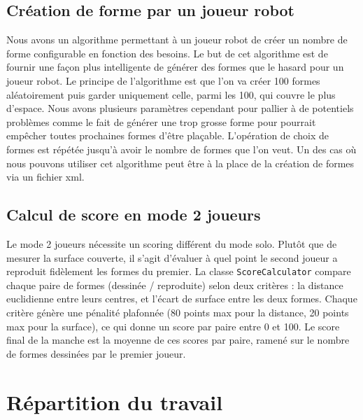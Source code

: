 \documentclass{article}
\begin{document}
\subsection{Création de forme par un joueur robot}
Nous avons un algorithme permettant à un joueur robot de créer un nombre de forme configurable en fonction des besoins. Le but de cet algorithme est de fournir une façon plus intelligente de générer des formes que le hasard pour un joueur robot.
Le principe de l'algorithme est que l'on va créer 100 formes aléatoirement puis garder uniquement celle, parmi les 100, qui couvre le plus d'espace. Nous avons plusieurs paramètres cependant pour pallier à de potentiels problèmes comme le fait de générer une trop grosse forme pour pourrait empêcher toutes prochaines formes d'être plaçable. L'opération de choix de formes est répétée jusqu'à avoir le nombre de formes que l'on veut. Un des cas où nous pouvons utiliser cet algorithme peut être à la place de la création de formes via un fichier xml.

\subsection{Calcul de score en mode 2 joueurs}
Le mode 2 joueurs nécessite un scoring différent du mode solo. Plutôt que de mesurer la surface couverte, il s'agit d'évaluer à quel point le second joueur a reproduit fidèlement les formes du premier. La classe \texttt{ScoreCalculator} compare chaque paire de formes (dessinée / reproduite) selon deux critères : la distance euclidienne entre leurs centres, et l'écart de surface entre les deux formes. Chaque critère génère une pénalité plafonnée (80 points max pour la distance, 20 points max pour la surface), ce qui donne un score par paire entre 0 et 100. Le score final de la manche est la moyenne de ces scores par paire, ramené sur le nombre de formes dessinées par le premier joueur.

\section{Répartition du travail}
\end{document}
